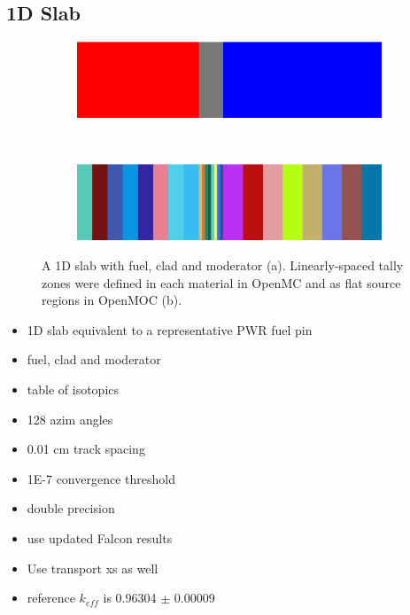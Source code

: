 \subsection{1D Slab}
\label{subsec:chap4-slab}

\begin{figure}[h!]
\begin{subfigure}{\textwidth}
  \centering
  \includegraphics[width=\linewidth]{figures/biases/slab/slab-simple}
  \caption{}
\end{subfigure} \\
\begin{subfigure}{\textwidth}
  \centering
  \includegraphics[width=\linewidth]{figures/biases/slab/slab-8x}
  \caption{}
\end{subfigure}
\caption[1D slab materials and geometry]{A 1D slab with fuel, clad and moderator (a). Linearly-spaced tally zones were defined in each material in OpenMC and as flat source regions in OpenMOC (b).}
\label{fig:chap4-slab}
\end{figure}

\begin{itemize}[noitemsep]
  \item 1D slab equivalent to a representative \ac{PWR} fuel pin
  \item fuel, clad and moderator
  \item table of isotopics
  \item 128 azim angles
  \item 0.01 cm track spacing
  \item 1E-7 convergence threshold
  \item double precision
  \item use updated Falcon results
  \item Use transport xs as well
  \item reference $k_{eff}$ is 0.96304 $\pm$ 0.00009
\end{itemize}

